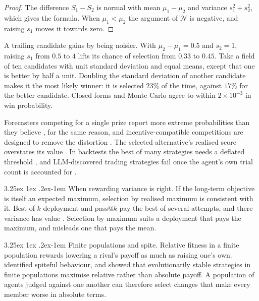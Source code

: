 \documentclass[11pt]{article}
\makeatletter
\renewcommand\paragraph{\@startsection{paragraph}{4}{\z@}%
  {3.25ex \@plus1ex \@minus.2ex}{-1em}%
  {\normalfont\normalsize\itshape}}
\theoremstyle{definition}
\theoremstyle{remark}
\makeatother
\begin{document}
\begin{proof}
The difference $S_1-S_2$ is normal with mean $\mu_1-\mu_2$ and variance $s_1^2+s_2^2$, which
gives the formula. When $\mu_1<\mu_2$ the argument of $\mathcal{N}$ is negative, and raising
$s_1$ moves it towards zero.
\end{proof}

A trailing candidate gains by being noisier. With $\mu_2-\mu_1=0.5$ and $s_2=1$, raising $s_1$
from $0.5$ to $4$ lifts its chance of selection from $0.33$ to $0.45$. Take a field of ten
candidates with unit standard deviation and equal means, except that one is better by half a
unit. Doubling the standard deviation of another candidate makes it the most likely winner: it
is selected $23\%$ of the time, against $17\%$ for the better candidate. Closed forms and Monte Carlo
agree to within $2\times10^{-3}$ in win probability.

Forecasters competing for a single prize report more extreme probabilities than they believe
\citep{lichtendahl2007competition}, for the same reason, and incentive-compatible competitions
are designed to remove the distortion \citep{witkowski2021competitions}. The selected
alternative's realised score overstates its value \citep{smith2006optimizer}. In backtests the
best of many strategies needs a deflated threshold \citep{bailey2014deflated}, and LLM-discovered
trading strategies fail once the agent's own trial count is accounted for
\citep{gencay2026honest}.

\paragraph{When rewarding variance is right.} If the long-term objective is itself an expected
maximum, selection by realised maximum is consistent with it. Best-of-$k$ deployment and
pass@$k$ pay the best of several attempts, and there variance has value
\citep{cotton2026wavefront,cotton2026passk}. Selection by maximum suits a deployment that pays the
maximum, and misleads one that pays the mean.

\paragraph{Finite populations and spite.} Relative fitness in a finite population rewards
lowering a rival's payoff as much as raising one's own. \citet{hamilton1970spite} identified
spiteful behaviour, and \citet{schaffer1988finite} showed that evolutionarily stable strategies
in finite populations maximise relative rather than absolute payoff. A population of agents
judged against one another can therefore select changes that make every member worse in
absolute terms.
\end{document}
